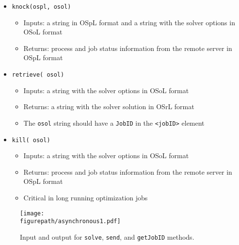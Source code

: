 \documentclass[11pt]{article}
\newcommand{\figurepath}{./figures}
\renewcommand{\_}{{\char"5F}}
\renewcommand{\{}{{\char"7B}}
\renewcommand{\}}{{\char"7D}}
\renewcommand{\^}{{\char"0D}}
\renewcommand{\'}{{\char"0D}}
\begin{document}
\begin{itemize}
\item {\tt knock(ospl, osol)}

\begin{itemize}

\item Inputs: a string in OSpL format and a string with the solver options in OSoL format

\item  Returns: process and job status information from the remote server in OSpL format

\end{itemize}

\item {\tt retrieve( osol)}


\begin{itemize}

\item Inputs: a string with the solver options  in OSoL format  

\item Returns: a string with the solver solution in OSrL format

\item The {\tt osol} string should have a {\tt JobID} in the {\tt <jobID>} element

\end{itemize}

\item {\tt kill( osol)}


\begin{itemize}

\item Inputs: a string with the solver options  in OSoL format  

\item  Returns: process and job status information from the remote server in OSpL format

\item  Critical in long running optimization jobs

\end{itemize}

\end{itemize}



\begin{figure}[ht]
\centering
\texttt{[image: \\figurepath/asynchronous1.pdf]}
\caption{Input and output for {\tt solve}, {\tt send}, and {\tt getJobID} methods.} 
\label{figure:async1}
\end{figure}
\end{document}
